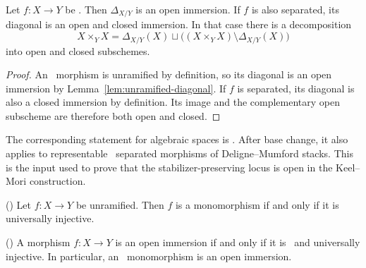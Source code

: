 \begin{corollary}
	\label{cor:etale-separated-diagonal}
	Let $f:X\to Y$ be \etale. Then
	$\Delta_{X/Y}$ is an open immersion.
	If $f$ is also separated, its diagonal is an open
	and closed immersion. In that case there is a
	decomposition
	\[
	X\times_Y X
	=
	\Delta_{X/Y}(X)
	\sqcup
	\bigl((X\times_Y X)\setminus\Delta_{X/Y}(X)\bigr)
	\]
	into open and closed subschemes.
\end{corollary}

\begin{proof}
	An \etale\ morphism is unramified by definition,
	so its diagonal is an open immersion by
	Lemma~\ref{lem:unramified-diagonal}.
	If $f$ is separated, its diagonal is also a closed
	immersion by definition. Its image and the
	complementary open subscheme are therefore both
	open and closed.
\end{proof}

\begin{remark}
	The corresponding statement for algebraic spaces
	is \cite[][Tag 05W1]{stacks-project}.
	After base change, it also applies to representable
	\etale\ separated morphisms of Deligne--Mumford
	stacks. This is the input used to prove that the
	stabilizer-preserving locus is open in the
	Keel--Mori construction.
\end{remark}

\begin{lemma}
	\label{lem:unramified-monomorphism}
	(\cite[][Tag 05VH]{stacks-project})
	Let $f:X\to Y$ be unramified.
	Then $f$ is a monomorphism if and only if it is
	universally injective.
\end{lemma}

\begin{proposition}
	\label{prop:etale-open-immersion}
	(\cite[][Tag 02LC]{stacks-project})
	A morphism $f:X\to Y$ is an open immersion if and
	only if it is \etale\ and universally injective.
	In particular, an \etale\ monomorphism is an
	open immersion.
\end{proposition}

